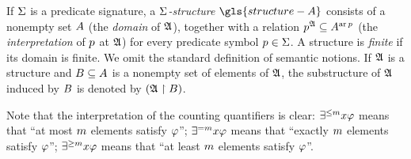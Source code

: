 
If $\mathrm{\Sigma}$ is a predicate signature, a \emph{$\mathrm{\Sigma}$-structure}
$\gls{structure-A}$ consists of a nonempty set $A$ (the \emph{domain} of
$\mathfrak{A}$), together with a relation $p^{\mathfrak{A}} \subseteq A^{\operatorname{ar}p}$ (the
\emph{interpretation} of $p$ at $\mathfrak{A}$) for every predicate symbol $p
\in \mathrm{\Sigma}$. A structure is \emph{finite} if its domain is finite.
We omit the standard definition of semantic notions.
If $\mathfrak{A}$ is a structure and $B \subseteq A$ is a nonempty set of
elements of $\mathfrak{A}$, the substructure of $\mathfrak{A}$ induced by $B$ is denoted
by $(\mathfrak{A} \restriction B)$.

Note that the interpretation of the counting quantifiers is clear:
$\exists^{\leq m}x\varphi$ means that ``at most $m$ elements satisfy $\varphi$'';
$\exists^{=m}x\varphi$ means that ``exactly $m$ elements satisfy $\varphi$'';
$\exists^{\geq m}x\varphi$ means that ``at least $m$ elements satisfy $\varphi$''.